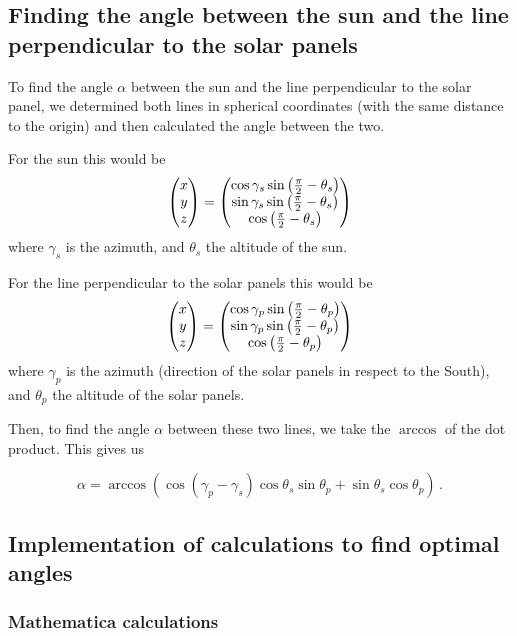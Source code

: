 \subsection{Finding the angle between the sun and the line perpendicular to the solar panels}\label{subsec:findingTheAngleBetweenTheSunAndTheLinePerpendicularToTheSolarPanels}
To find the angle $\alpha$ between the sun and the line perpendicular to the solar panel, we determined both lines in spherical coordinates (with the same distance to the origin) and then calculated the angle between the two.


For the sun this would be
\[
    \begin{pmatrix} x \\ y \\ z \end{pmatrix} =
    \begin{pmatrix} \cos \gamma_s \sin \left(\frac{\pi}{2} - \theta_s\right) \\
    \sin \gamma_s \sin \left(\frac{\pi}{2} - \theta_s\right) \\
    \cos \left(\frac{\pi}{2} - \theta_s\right) \end{pmatrix}
\]
where $ \gamma_s $ is the azimuth, and $ \theta_s $ the altitude of the sun.


For the line perpendicular to the solar panels this would be
\[
    \begin{pmatrix} x \\ y \\ z \end{pmatrix} =
    \begin{pmatrix} \cos \gamma_p \sin \left(\frac{\pi}{2} - \theta_p\right) \\
    \sin \gamma_p \sin \left(\frac{\pi}{2} - \theta_p\right) \\
    \cos \left(\frac{\pi}{2} - \theta_p\right) \end{pmatrix}
\]
where $ \gamma_p $ is the azimuth (direction of the solar panels in respect to the South), and $ \theta_p $ the altitude of the solar panels.

Then, to find the angle $\alpha$ between these two lines, we take the $ \arccos $ of the dot product.
This gives us

\[
    \alpha = \arccos (\cos (\gamma_p - \gamma_s) \cos \theta_s \sin \theta_p + \sin \theta_s \cos \theta_p)\,.
\]

\subsection{Implementation of calculations to find optimal angles}

\subsubsection{Mathematica calculations}\label{subsec:mathematicaCalculations}

